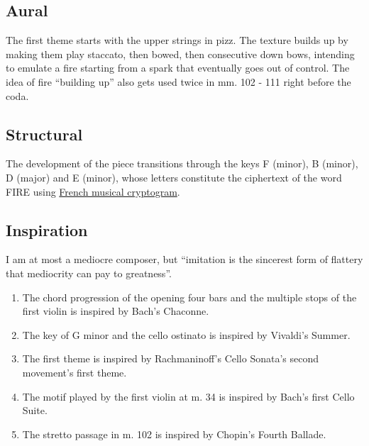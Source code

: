 \documentclass[12pt]{article}
\begin{document}
\subsection{Aural}
The first theme starts with the upper strings in pizz. The texture builds up by making them play staccato, then bowed, then consecutive down bows, intending to emulate a fire starting from a spark that eventually goes out of control. The idea of fire ``building up'' also gets used twice in mm. 102 - 111 right before the coda.

\subsection{Structural}
The development of the piece transitions through the keys F (minor), B (minor), D (major) and E (minor), whose letters constitute the ciphertext of the word FIRE using \href{https://en.wikipedia.org/wiki/Musical_cryptogram#French}{French musical cryptogram}.

\subsection{Inspiration}
I am at most a mediocre composer, but ``imitation is the sincerest form of flattery that mediocrity can pay to greatness''.
\begin{enumerate}
\item The chord progression of the opening four bars and the multiple stops of the first violin is inspired by Bach's Chaconne.
\item The key of G minor and the cello ostinato is inspired by Vivaldi's Summer.
\item The first theme is inspired by Rachmaninoff's Cello Sonata's second movement's first theme.
\item The motif played by the first violin at m. 34 is inspired by Bach's first Cello Suite.
\item The stretto passage in m. 102 is inspired by Chopin's Fourth Ballade.
\end{enumerate}
\end{document}
